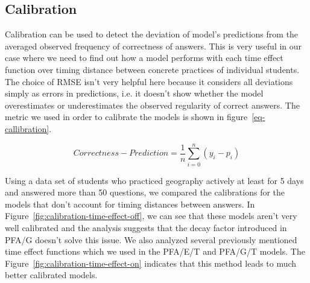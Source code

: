 \subsection{Calibration}

Calibration can be used to detect the deviation of model's predictions from the averaged observed frequency of correctness of answers. This is very useful in our case where we need to find out how a model performs with each time effect function over timing distance between concrete practices of individual students. The choice of RMSE isn't very helpful here because it considers all deviations simply as errors in predictions, i.e. it doesn't show whether the model overestimates or underestimates the observed regularity of correct answers. The metric we used in order to calibrate the models is shown in figure~\ref{eq-callibration}.

\begin{equation} \label{eq-callibration}
  \mathit{Correctness} - \mathit{Prediction} = \frac{1}{n} \sum_{i=0}^{n} (y_i - p_i)
\end{equation}

Using a data set of students who practiced geography actively at least for 5 days and answered more than 50 questions, we compared the calibrations for the models that don't account for timing distances between answers. In Figure~\ref{fig:calibration-time-effect-off}, we can see that these models aren't very well calibrated and the analysis suggests that the decay factor introduced in PFA/G doesn't solve this issue. We also analyzed several previously mentioned time effect functions which we used in the PFA/E/T and PFA/G/T models. The Figure~\ref{fig:calibration-time-effect-on} indicates that this method leads to much better calibrated models.

